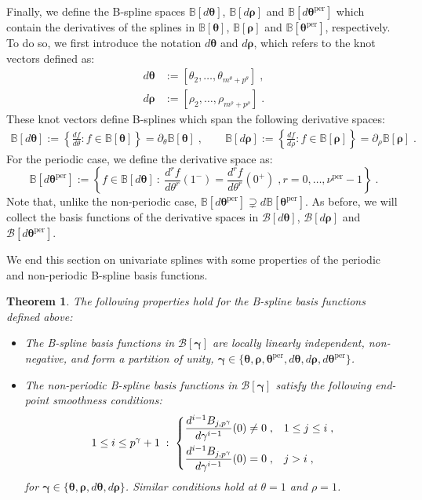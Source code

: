 \documentclass[10pt]{article}
\newcommand{\mbf}[1]{{\boldsymbol{#1}}}
\newcommand{\basis}[1]{\mathcal{#1}}
\newcommand{\vSpace}[1]{\mathbb{#1}}
\newcommand{\cU}{\theta}
\newcommand{\cV}{\rho}
\newcommand{\dcU}{\mathit{d\cU}}
\newcommand{\degU}{p^\cU}
\newcommand{\degV}{p^\cV}
\newcommand{\kntU}{\cU}
\newcommand{\kntV}{\cV}
\newcommand{\kntsU}{\mbf{\kntU}}
\newcommand{\kntsV}{\mbf{\kntV}}
\newcommand{\pkntsU}{\kntsU^\per}
\newcommand{\ndofU}{m^\cU}
\newcommand{\ndofV}{m^\cV}
\newcommand{\bsp}{B}
\newcommand{\bspB}{\basis{\bsp}}
\newcommand{\bspS}{\vSpace{\bsp}}
\newcommand{\per}{\mathrm{per}}
\newcommand{\pSmU}{\nu^\per}
\theoremstyle{plain}
\newtheorem{theorem}{Theorem}[section]
\theoremstyle{definition}
\theoremstyle{remark}
\begin{document}
Finally, we define the B-spline spaces $\bspS[d\kntsU]$, $\bspS[d\kntsV]$ and $\bspS[d\pkntsU]$ which contain the derivatives of the splines in $\bspS[\kntsU]$, $\bspS[\kntsV]$ and $\bspS[\pkntsU]$, respectively.
To do so, we first introduce the notation $d\kntsU$ and $d\kntsV$, which refers to the knot vectors defined as:
\begin{equation}
  \begin{split}
    d\kntsU &:= [\kntU_2, \dots, \kntU_{\ndofU+\degU}]\;,\\
    d\kntsV &:= [\kntV_2, \dots, \kntV_{\ndofV+\degV}]\;.
  \end{split}
\end{equation}
These knot vectors define B-splines which span the following derivative spaces:
\begin{equation}
  \begin{split}
        \bspS[d\kntsU] := \left\{\frac{df}{d\cU}:f \in \bspS[\kntsU]\right\} = \partial_{\cU}\bspS[\kntsU]\;,\qquad
        \bspS[d\kntsV] := \left\{\frac{df}{d\cV}:f \in \bspS[\kntsV]\right\} = \partial_{\cV}\bspS[\kntsV]\;.
  \end{split}
\end{equation}
For the periodic case, we define the derivative space as:
\begin{equation}
  \bspS[d\pkntsU] := \left\{f \in \bspS[d\kntsU]~:~\dfrac{d^rf}{\dcU^r}(1^-) = \dfrac{d^rf}{\dcU^r}(0^+)\;,r = 0, \dots, \pSmU-1\right\}\;.
\end{equation}
Note that, unlike the non-periodic case, $\bspS[d\pkntsU] \supsetneq d\bspS[\pkntsU]$.
As before, we will collect the basis functions of the derivative spaces in $\bspB[d\kntsU]$, $\bspB[d\kntsV]$ and $\bspB[d\pkntsU]$.

We end this section on univariate splines with some properties of the periodic and non-periodic B-spline basis functions.
\begin{theorem}
  The following properties hold for the B-spline basis functions defined above:
  \begin{itemize}
    \item The B-spline basis functions in $\bspB[\mbf{\gamma}]$ are locally linearly
        independent, non-negative, and form a partition of unity, $\mbf{\gamma} \in \{\kntsU, \kntsV, \pkntsU, d\kntsU, d\kntsV, d\pkntsU\}$.
    \item The non-periodic B-spline basis functions in $\bspB[\mbf{\gamma}]$ satisfy the following end-point smoothness conditions:
    \begin{equation*}
      1 \leq i \leq p^\gamma+1\;:\;
      \begin{dcases}
        \dfrac{d^{i-1}\bsp_{j,p^\gamma}}{d\gamma^{i-1}}(0) \neq 0\;, & 1 \leq j \leq i\;,\\
        \dfrac{d^{i-1}\bsp_{j,p^\gamma}}{d\gamma^{i-1}}(0) = 0\;, & j > i\;,
      \end{dcases}
    \end{equation*}
    for $\mbf{\gamma} \in \{\kntsU, \kntsV, d\kntsU, d\kntsV\}$. Similar conditions hold at $\cU = 1$ and $\cV = 1$.
  \end{itemize}
\end{theorem}
\end{document}
